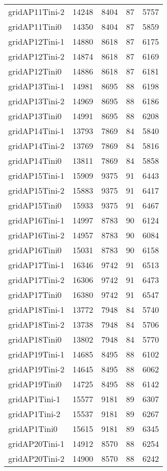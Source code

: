 \begin{longtable}{lrrrr}
gridAP11Tini-2 & 14248 & 8404 & 87 & 5757 \\
gridAP11Tini0 & 14350 & 8404 & 87 & 5859 \\
gridAP12Tini-1 & 14880 & 8618 & 87 & 6175 \\
gridAP12Tini-2 & 14874 & 8618 & 87 & 6169 \\
gridAP12Tini0 & 14886 & 8618 & 87 & 6181 \\
gridAP13Tini-1 & 14981 & 8695 & 88 & 6198 \\
gridAP13Tini-2 & 14969 & 8695 & 88 & 6186 \\
gridAP13Tini0 & 14991 & 8695 & 88 & 6208 \\
gridAP14Tini-1 & 13793 & 7869 & 84 & 5840 \\
gridAP14Tini-2 & 13769 & 7869 & 84 & 5816 \\
gridAP14Tini0 & 13811 & 7869 & 84 & 5858 \\
gridAP15Tini-1 & 15909 & 9375 & 91 & 6443 \\
gridAP15Tini-2 & 15883 & 9375 & 91 & 6417 \\
gridAP15Tini0 & 15933 & 9375 & 91 & 6467 \\
gridAP16Tini-1 & 14997 & 8783 & 90 & 6124 \\
gridAP16Tini-2 & 14957 & 8783 & 90 & 6084 \\
gridAP16Tini0 & 15031 & 8783 & 90 & 6158 \\
gridAP17Tini-1 & 16346 & 9742 & 91 & 6513 \\
gridAP17Tini-2 & 16306 & 9742 & 91 & 6473 \\
gridAP17Tini0 & 16380 & 9742 & 91 & 6547 \\
gridAP18Tini-1 & 13772 & 7948 & 84 & 5740 \\
gridAP18Tini-2 & 13738 & 7948 & 84 & 5706 \\
gridAP18Tini0 & 13802 & 7948 & 84 & 5770 \\
gridAP19Tini-1 & 14685 & 8495 & 88 & 6102 \\
gridAP19Tini-2 & 14645 & 8495 & 88 & 6062 \\
gridAP19Tini0 & 14725 & 8495 & 88 & 6142 \\
gridAP1Tini-1 & 15577 & 9181 & 89 & 6307 \\
gridAP1Tini-2 & 15537 & 9181 & 89 & 6267 \\
gridAP1Tini0 & 15615 & 9181 & 89 & 6345 \\
gridAP20Tini-1 & 14912 & 8570 & 88 & 6254 \\
gridAP20Tini-2 & 14900 & 8570 & 88 & 6242 \\

\end{longtable}
